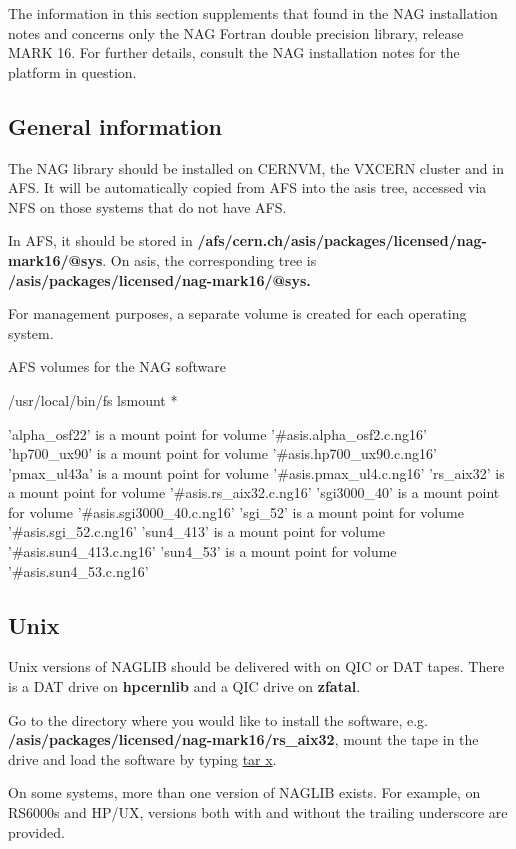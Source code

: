 The information in this section supplements that found in the NAG installation
notes and concerns only the NAG Fortran double precision library, release
MARK 16. For further details, consult the NAG installation notes for the
platform in question. 

\subsection{General information}

The NAG library should be installed on CERNVM, the VXCERN cluster
and in AFS. It will be automatically copied from AFS into the asis
tree, accessed via NFS on those systems that do not have AFS.

In AFS, it should be stored in {\bf /afs/cern.ch/asis/packages/licensed/nag-mark16/@sys}.
On asis, the corresponding tree is {\bf /asis/packages/licensed/nag-mark16/@sys.}

For management purposes, a separate volume is created for each operating system.

\begin{XMPt}{AFS volumes for the NAG software}

/usr/local/bin/fs lsmount *

'alpha_osf22' is a mount point for volume '#asis.alpha_osf2.c.ng16'
'hp700_ux90' is a mount point for volume '#asis.hp700_ux90.c.ng16'
'pmax_ul43a' is a mount point for volume '#asis.pmax_ul4.c.ng16'
'rs_aix32' is a mount point for volume '#asis.rs_aix32.c.ng16'
'sgi3000_40' is a mount point for volume '#asis.sgi3000_40.c.ng16'
'sgi_52' is a mount point for volume '#asis.sgi_52.c.ng16'
'sun4_413' is a mount point for volume '#asis.sun4_413.c.ng16'
'sun4_53' is a mount point for volume '#asis.sun4_53.c.ng16'

\end{XMPt}

\subsection{Unix}

Unix versions of NAGLIB should be delivered with on QIC or DAT tapes.
There is a DAT drive on {\bf hpcernlib} and a QIC drive on {\bf zfatal}.

Go to the directory where you would like to install the software, e.g.
{\bf /asis/packages/licensed/nag-mark16/rs\_aix32}, mount the tape
in the drive and load the software by typing \underline{tar x}.

On some systems, more than one version of NAGLIB exists. For example,
on RS6000s and HP/UX, versions both with and without the trailing
underscore are provided. 

